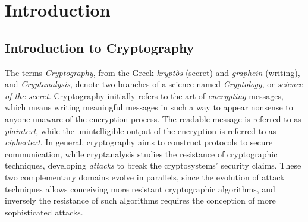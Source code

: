 
\chapter{Introduction} %

\label{ChapterIntroduction}


\section{Introduction to Cryptography}
The terms \emph{Cryptography}, from the Greek \emph{krypt\`os} (secret) and \emph{graphein} (writing), and \emph{Cryptanalysis}, denote two branches of a science named \emph{Cryptology}, or \emph{science of the secret}. Cryptography initially refers to the art of \emph{encrypting} messages, which means writing meaningful messages in such a way to appear nonsense to anyone unaware of the encryption process. The readable message is referred to as \emph{plaintext}, while the unintelligible output of the encryption is referred to as \emph{ciphertext}. In general, cryptography aims to construct protocols to secure communication, while cryptanalysis studies the resistance of cryptographic techniques, developing \emph{attacks} to break the cryptosystems' security claims. These two complementary domains evolve in parallels, since the evolution of attack techniques allows conceiving more resistant cryptographic algorithms, and inversely the resistance of such algorithms requires the conception of more sophisticated attacks.\\

